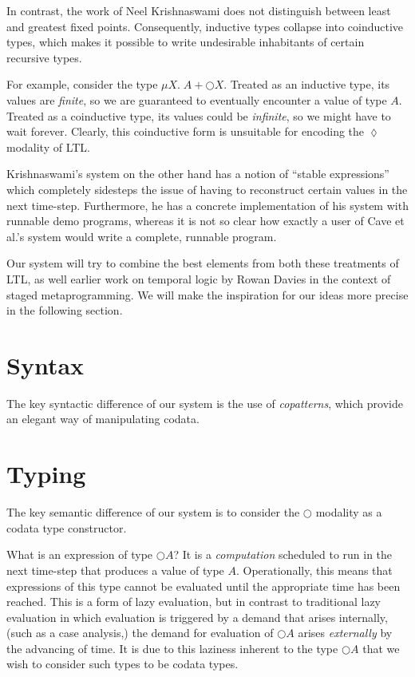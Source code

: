 \documentclass[11pt]{article}
\renewcommand{\circle}{\bigcirc}
\newcommand{\eventually}{\lozenge}
\begin{document}
In contrast, the work of Neel Krishnaswami\cite{neelk1} does not distinguish
between least and greatest fixed points. Consequently, inductive types collapse
into coinductive types, which makes it possible to write undesirable
inhabitants of certain recursive types.

For example, consider the type $\mu X.\; A + \circle X$.
Treated as an inductive type, its values are \emph{finite}, so we are
guaranteed to eventually encounter a value of type $A$.
Treated as a coinductive type, its values could be \emph{infinite}, so we might
have to wait forever.
Clearly, this coinductive form is unsuitable for encoding the $\eventually$
modality of LTL.

Krishnaswami's system on the other hand has a notion of ``stable expressions''
which completely sidesteps the issue of having to reconstruct certain values in
the next time-step. Furthermore, he has a concrete implementation of his system
with runnable demo programs, whereas it is not so clear how exactly a user of
Cave et al.'s system would write a complete, runnable program.

Our system will try to combine the best elements from both these treatments of
LTL, as well earlier work on temporal logic by Rowan Davies in the context of
staged metaprogramming.
We will make the inspiration for our ideas more precise in the following
section.

\section{Syntax}
\label{sec:syntax}

The key syntactic difference of our system is the use of
\emph{copatterns}\cite{copatterns}, which provide an elegant way of
manipulating codata.

\section{Typing}
\label{sec:types}

The key semantic difference of our system is to consider the $\circle$ modality
as a codata type constructor.

What is an expression of type $\circle A$?
It is a \emph{computation} scheduled to run in the next time-step that produces
a value of type $A$.
Operationally, this means that expressions of this type cannot be evaluated
until the appropriate time has been reached.
This is a form of lazy evaluation, but in contrast to traditional lazy
evaluation in which evaluation is triggered by a demand that arises internally,
(such as a case analysis,) the demand for evaluation of $\circle A$ arises
\emph{externally} by the advancing of time.
It is due to this laziness inherent to the type $\circle A$ that we wish to
consider such types to be codata types.
\end{document}
